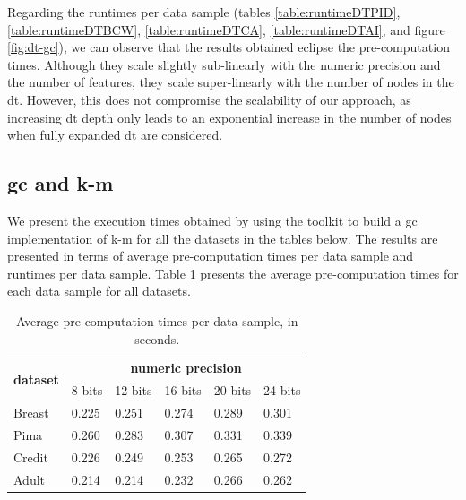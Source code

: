 Regarding the runtimes per data sample (tables \ref{table:runtimeDTPID}, \ref{table:runtimeDTBCW}, \ref{table:runtimeDTCA}, \ref{table:runtimeDTAI}, and figure \ref{fig:dt-gc}), we can observe that the results obtained eclipse the pre-computation times. Although they scale slightly sub-linearly with the numeric precision and the number of features, they scale super-linearly with the number of nodes in the \ac{dt}. However, this does not compromise the scalability of our approach, as increasing \ac{dt} depth only leads to an exponential increase in the number of nodes when fully expanded \ac{dt} are considered.


\subsection{\acl{gc} and \acl{k-m}}
\label{ssec:gcandKM}


We present the execution times obtained by using the toolkit to build a \ac{gc} implementation of \ac{k-m} for all the datasets in the tables below. The results are presented in terms of average pre-computation times per data sample and runtimes per data sample. Table \ref{table:avgKMAllDatasets} presents the average pre-computation times for each data sample for all datasets.

\begin{table}[H]
\centering
\caption{Average pre-computation times per data sample, in seconds.}
\label{table:avgKMAllDatasets}
\begin{tabular}{|l|l|l|l|l|l|}
\hline
\multirow{2}{*}{\textbf{dataset}} & \multicolumn{5}{c|}{\textbf{numeric precision}}                                             \\ \cline{2-6} 
                                  & 8 bits & 12 bits & 16 bits & 20 bits & 24 bits \\ \hline
Breast                            & 0.225           & 0.251            & 0.274            & 0.289            & 0.301            \\ \hline
Pima                              & 0.260           & 0.283            & 0.307            & 0.331            & 0.339            \\ \hline
Credit                            & 0.226           & 0.249            & 0.253            & 0.265            & 0.272            \\ \hline
Adult                             & 0.214           & 0.214            & 0.232            & 0.266            & 0.262            \\ \hline
\end{tabular}
\end{table}

